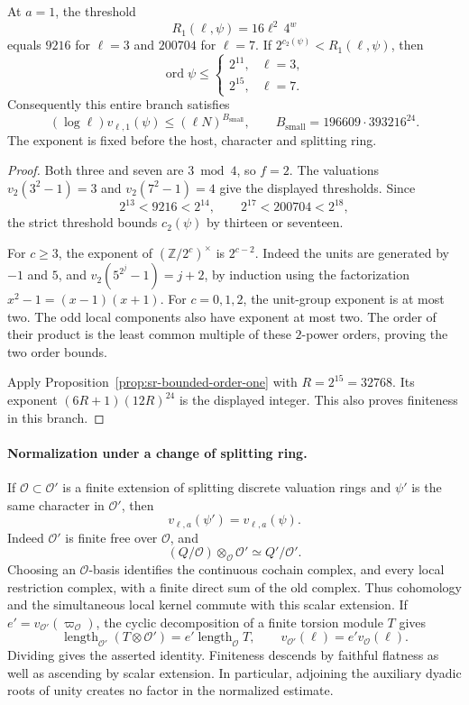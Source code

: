 \begin{srproposition}
\label{prop:sr-small-conductor-exceptional}
At \(a=1\), the threshold
\[
                    R_1(\ell,\psi)=16\ell^2\,4^w
\]
equals \(9216\) for \(\ell=3\) and \(200704\) for \(\ell=7\).
If \(2^{c_2(\psi)}<R_1(\ell,\psi)\), then
\[
 \operatorname{ord}\psi\leq
 \begin{cases}2^{11},&\ell=3,\\2^{15},&\ell=7.\end{cases}
\]
Consequently this entire branch satisfies
\[
 (\log\ell)v_{\ell,1}(\psi)\leq(\ell N)^{B_{\mathrm{small}}},
 \qquad
 B_{\mathrm{small}}=196609\cdot393216^{24}.
\]
The exponent is fixed before the host, character and splitting ring.
\end{srproposition}
\begin{proof}
Both three and seven are \(3\bmod4\), so \(f=2\).
The valuations \(v_2(3^2-1)=3\) and \(v_2(7^2-1)=4\) give the displayed
thresholds. Since
\[
 2^{13}<9216<2^{14},\qquad
 2^{17}<200704<2^{18},
\]
the strict threshold bounds \(c_2(\psi)\) by thirteen or seventeen.

For \(c\geq3\), the exponent of \((\mathbb Z/2^c)^\times\) is
\(2^{c-2}\). Indeed the units are generated by \(-1\) and \(5\), and
\(v_2(5^{2^j}-1)=j+2\), by induction using the factorization
\(x^2-1=(x-1)(x+1)\). For \(c=0,1,2\), the unit-group exponent is at
most two. The odd local components also have exponent at most two.
The order of their product is the least common multiple of these
\(2\)-power orders, proving the two order bounds.

Apply Proposition~\ref{prop:sr-bounded-order-one} with \(R=2^{15}=32768\).
Its exponent \((6R+1)(12R)^{24}\) is the displayed integer.
This also proves finiteness in this branch.
\end{proof}

\paragraph{Normalization under a change of splitting ring.}
If \(\mathcal O\subset\mathcal O'\) is a finite extension of splitting
discrete valuation rings and \(\psi'\) is the same character in
\(\mathcal O'\), then
\[
                         v_{\ell,a}(\psi')=v_{\ell,a}(\psi).
\]
Indeed \(\mathcal O'\) is finite free over \(\mathcal O\), and
\[
 (Q/\mathcal O)\otimes_{\mathcal O}\mathcal O'
                       \simeq Q'/\mathcal O'.
\]
Choosing an \(\mathcal O\)-basis identifies the continuous cochain
complex, and every local restriction complex, with a finite direct
sum of the old complex. Thus cohomology and the simultaneous local
kernel commute with this scalar extension. If
\(e'=v_{\mathcal O'}(\varpi_{\mathcal O})\), the cyclic decomposition
of a finite torsion module \(T\) gives
\[
 \operatorname{length}_{\mathcal O'}(T\otimes\mathcal O')
       =e'\operatorname{length}_{\mathcal O}T,\qquad
 v_{\mathcal O'}(\ell)=e'v_{\mathcal O}(\ell).
\]
Dividing gives the asserted identity. Finiteness descends by faithful
flatness as well as ascending by scalar extension. In particular,
adjoining the auxiliary dyadic roots of unity creates no factor in
the normalized estimate.

